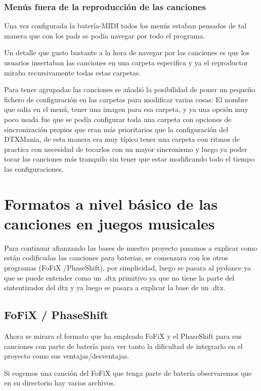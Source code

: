 \documentclass[a4paper,11pt,oneside]{book}
\begin{document}
\subsubsection{Menús fuera de la reproducción de las canciones}
Una vez configurada la batería-MIDI todos los menús estaban pensados de tal manera que con los pads se podía navegar por todo el programa.


Un detalle que gusto bastante a la hora de navegar por las canciones es que los usuarios insertaban las canciones en una carpeta especifica y ya el reproductor miraba recursivamente todas estas carpetas.

Para tener agrupadas las canciones se añadió la posibilidad de poner un pequeño fichero de configuración en las carpetas para modificar varias cosas:
El nombre que salia en el menú, tener una imagen para esa carpeta, y ya una opción muy poco usada fue que se podía configurar toda una carpeta con opciones de sincronización propios que eran más prioritarios que la configuración del DTXMania, de esta manera era muy típico tener una carpeta con ritmos de practica con necesidad de tocarlos con un mayor sincronismo y luego ya poder tocar las canciones más tranquilo sin tener que estar modificando todo el tiempo las configuraciones.

\section{Formatos a nivel básico de las canciones en juegos musicales}
Para continuar afianzando las bases de nuestro proyecto pasamos a explicar como están codificadas las canciones para baterias, se comenzara con los otros programas (FoFiX /PhaseShift), por simplicidad, luego se pasara al pydance ya que se puede entender como un .dtx primitivo ya que no tiene la parte del sintentizador del dtx y ya luego se pasara a explicar la base de un .dtx.

\subsection{FoFiX / PhaseShift}

Ahora se mirara el formato que ha empleado FoFiX y el PhaseShift para sus canciones con parte de batería para ver tanto la dificultad de integrarlo en el proyecto como sus ventajas/desventajas.

Si cogemos una canción del FoFiX que tenga parte de batería observaremos que en su directorio hay varios archivos.
\end{document}
